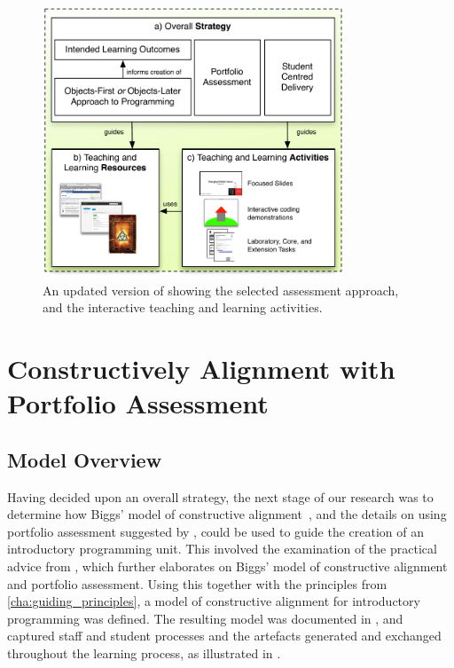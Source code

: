 \begin{figure}[hb]
	\centering
	\includegraphics[width=0.8\textwidth]{OverallStrategy}
	\caption{An updated version of  showing the selected assessment approach, and the interactive teaching and learning activities.}
	\label{fig:overall_strategy}
\end{figure}

\clearpage
\section{Constructively Alignment with Portfolio Assessment} %
\label{sec:model}



\subsection{Model Overview} %
\label{sub:model_overview}

Having decided upon an overall strategy, the next stage of our research was to determine how Biggs' model of constructive alignment~\cite{Biggs:1996c}, and the details on using portfolio assessment suggested by \citet{Biggs:1997}, could be used to guide the creation of an introductory programming unit. This involved the examination of the practical advice from \citet{Biggs:2007}, which further elaborates on Biggs' model of constructive alignment and portfolio assessment. Using this together with the principles from \cref{cha:guiding_principles}, a model of constructive alignment for introductory programming was defined. The resulting model was documented in \citet{Cain:2012a}, and captured staff and student processes and the artefacts generated and exchanged throughout the learning process, as illustrated in .

